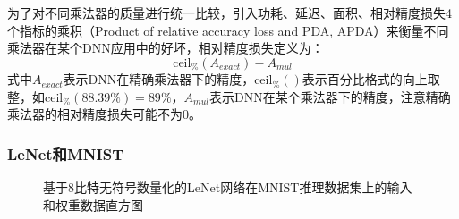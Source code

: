 为了对不同乘法器的质量进行统一比较，引入功耗、延迟、面积、相对精度损失4个指标的乘积（Product of relative accuracy loss and PDA, APDA）来衡量不同乘法器在某个DNN应用中的好坏，相对精度损失定义为：
\begin{equation}
     \text{ceil}_\% ( A_{exact} ) - A_{mul}
\label{AC:AM:Adapt:LeNet:Eq:accuracy_loss}
\end{equation}
式中$A_{exact}$表示DNN在精确乘法器下的精度，$\text{ceil}_\%()$表示百分比格式的向上取整，如$\text{ceil}_\%(88.39\%) = 89\% $，$A_{mul}$表示DNN在某个乘法器下的精度，注意精确乘法器的相对精度损失可能不为0。

\subsubsection{LeNet和MNIST}

\begin{figure}[!h]
    \centering
    \centering
    \caption{基于8比特无符号数量化的LeNet网络在MNIST推理数据集上的输入和权重数据直方图}
    \label{DNN:LeNet:Fig:LeNet_MNIST_distribution}
\end{figure}


